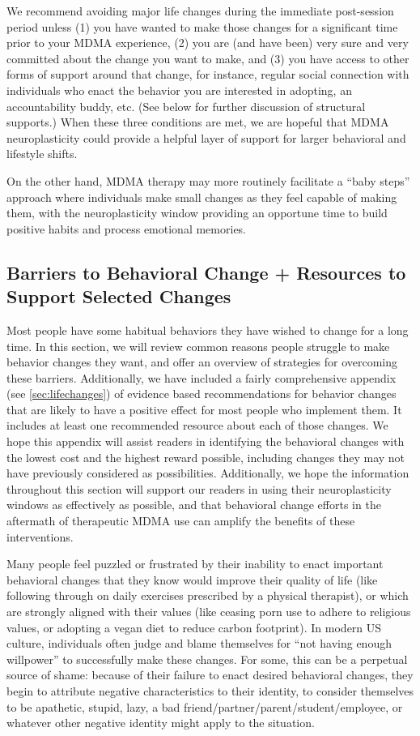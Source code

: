 \documentclass[12pt,letterpaper]{book}
\begin{document}
We recommend avoiding major life changes during the immediate post-session period unless (1) you have wanted to make those changes for a significant time prior to your MDMA experience, (2) you are (and have been) very sure and very committed about the change you want to make, and (3) you have access to other forms of support around that change, for instance, regular social connection with individuals who enact the behavior you are interested in adopting, an accountability buddy, etc. (See below for further discussion of structural supports.) When these three conditions are met, we are hopeful that MDMA neuroplasticity could provide a helpful layer of support for larger behavioral and lifestyle shifts.

On the other hand, MDMA therapy may more routinely facilitate a “baby steps” approach where individuals make small changes as they feel capable of making them, with the neuroplasticity window providing an opportune time to build positive habits and process emotional memories.

\subsection*{Barriers to Behavioral Change + Resources to Support Selected Changes}

Most people have some habitual behaviors they have wished to change for a long time. In this section, we will review common reasons people struggle to make behavior changes they want, and offer an overview of strategies for overcoming these barriers. Additionally, we have included a fairly comprehensive appendix (see \ref{sec:lifechanges}) of evidence based recommendations for behavior changes that are likely to have a positive effect for most people who implement them. It includes at least one recommended resource about each of those changes. We hope this appendix will assist readers in identifying the behavioral changes with the lowest cost and the highest reward possible, including changes they may not have previously considered as possibilities. Additionally, we hope the information throughout this section will support our readers in using their neuroplasticity windows as effectively as possible, and that behavioral change efforts in the aftermath of therapeutic MDMA use can amplify the benefits of these interventions.

Many people feel puzzled or frustrated by their inability to enact important behavioral changes that they know would improve their quality of life (like following through on daily exercises prescribed by a physical therapist), or which are strongly aligned with their values (like ceasing porn use to adhere to religious values, or adopting a vegan diet to reduce carbon footprint). In modern US culture, individuals often judge and blame themselves for “not having enough willpower” to successfully make these changes. For some, this can be a perpetual source of shame: because of their failure to enact desired behavioral changes, they begin to attribute negative characteristics to their identity, to consider themselves to be apathetic, stupid, lazy, a bad friend/partner/parent/student/employee, or whatever other negative identity might apply to the situation.
\end{document}
